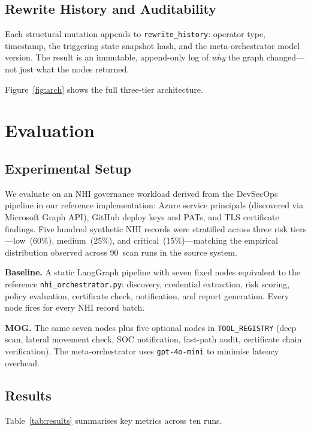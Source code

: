 \documentclass[conference]{IEEEtran}
\begin{document}
\subsection{Rewrite History and Auditability}

Each structural mutation appends to \texttt{rewrite\_history}:
operator type, timestamp, the triggering state snapshot hash, and
the meta-orchestrator model version. The result is an immutable,
append-only log of \emph{why} the graph changed---not just what
the nodes returned.

Figure~\ref{fig:arch} shows the full three-tier architecture.

\section{Evaluation}
\label{sec:eval}

\subsection{Experimental Setup}

We evaluate on an NHI governance workload derived from the
DevSecOps pipeline in our reference implementation: Azure service
principals (discovered via Microsoft Graph API), GitHub deploy keys
and PATs, and TLS certificate findings. Five hundred synthetic NHI
records were stratified across three risk tiers---low~(60\%),
medium~(25\%), and critical~(15\%)---matching the empirical distribution
observed across 90~scan runs in the source system.

\textbf{Baseline.} A static LangGraph pipeline with seven fixed nodes
equivalent to the reference \texttt{nhi\_orchestrator.py}: discovery,
credential extraction, risk scoring, policy evaluation, certificate
check, notification, and report generation. Every node fires for
every NHI record batch.

\textbf{MOG.} The same seven nodes plus five optional nodes in
\texttt{TOOL\_REGISTRY} (deep scan, lateral movement check, SOC
notification, fast-path audit, certificate chain verification). The
meta-orchestrator uses \texttt{gpt-4o-mini} to minimise latency
overhead.

\subsection{Results}

Table~\ref{tab:results} summarises key metrics across ten runs.
\end{document}
